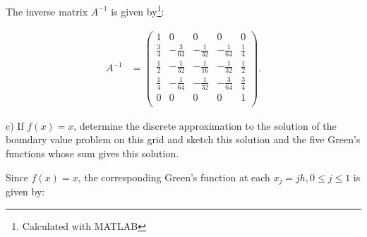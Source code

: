 \begin{solution}\ \\\\
    The inverse matrix $A^{-1}$ is given by\footnote{Calculated with MATLAB}:

    \begingroup
    \renewcommand*{\arraystretch}{1.5}
    \begin{align*}
        A^{-1} &=
        \begin{pmatrix}
                      1 &             0 &             0  &             0 &           0 \\
            \frac{3}{4} & -\frac{3}{64} & -\frac{1}{32}  & -\frac{1}{64} & \frac{1}{4} \\
            \frac{1}{2} & -\frac{1}{32} & -\frac{1}{16}  & -\frac{1}{32} & \frac{1}{2} \\
            \frac{1}{4} & -\frac{1}{64} & -\frac{1}{32}  & -\frac{3}{64} & \frac{3}{4} \\
                      0 &             0 &             0  &             0 &           1 \\
        \end{pmatrix}.
    \end{align*}
    \endgroup
\end{solution}

\pagebreak
c) If $f(x) = x$, determine the discrete approximation to the solution of the boundary value problem on this grid and
   sketch this solution and the five Green's functions whose sum gives this solution.


\begin{solution}
    Since $f(x) = x$, the corresponding Green's function at each $x_j = j h, 0 \le j \le 1$ is given by:



                                                                          
\end{solution}